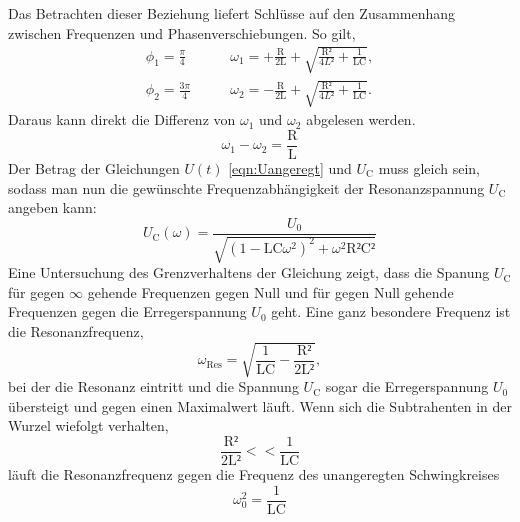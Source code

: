 \documentclass[titlepage = firstcover]{scrartcl}
\begin{document}
            Das Betrachten dieser Beziehung liefert Schlüsse auf den Zusammenhang zwischen Frequenzen und Phasenverschiebungen. So gilt,
            \begin{align}
                \phi_1 = \frac{\pi}{4}  &\qquad \omega_1 = + \frac{\text{R}}{\text{2L}} + \sqrt{\frac{\text{R²}}{4L²} + \frac{1}{\text{LC}}}, \\
                \phi_2 = \frac{3\pi}{4} &\qquad \omega_2 = - \frac{\text{R}}{\text{2L}} + \sqrt{\frac{\text{R²}}{4L²} + \frac{1}{\text{LC}}}.
                \label{eqn:freq}
            \end{align}
            Daraus kann direkt die Differenz von $\omega_1$ und $\omega_2$ abgelesen werden.
            \begin{equation}
                \omega_1 - \omega_2 = \frac{\text{R}}{\text{L}}
                \label{eqn:w1-w2}
            \end{equation}
            Der Betrag der Gleichungen $U(t)$ \ref{eqn:Uangeregt} und $U_{\text{C}}$ muss gleich sein, sodass man nun die gewünschte Frequenzabhängigkeit
            der Resonanzspannung $U_{\text{C}}$ angeben kann:
            \begin{equation}
                U_{\text{C}}(\omega) = \frac{U_0}{\sqrt{\left(1-\text{LC}\omega^2\right)^2 + \omega^2\text{R²C²}}}
                \label{eqn:Uvonw}
            \end{equation}  
            Eine Untersuchung des Grenzverhaltens der Gleichung zeigt, dass die Spanung $U_{\text{C}}$ für gegen $\infty$ gehende Frequenzen gegen Null und für
            gegen Null gehende Frequenzen gegen die Erregerspannung $U_0$ geht. Eine ganz besondere Frequenz ist die Resonanzfrequenz,
            \begin{equation}
                \omega_{\text{Res}} = \sqrt{\frac{1}{\text{LC}}-\frac{\text{R²}}{\text{2L²}}},
                \label{eqn:Resonanzfreq}
            \end{equation}
            bei der die Resonanz eintritt und die Spannung $U_{\text{C}}$ sogar die Erregerspannung $U_0$ übersteigt und gegen einen Maximalwert läuft.
            Wenn sich die Subtrahenten in der Wurzel wiefolgt verhalten,
            \begin{equation*}
                \frac{\text{R²}}{\text{2L²}} << \frac{1}{\text{LC}}
            \end{equation*} 
            läuft die Resonanzfrequenz gegen die Frequenz des unangeregten Schwingkreises
            \begin{equation*}
                \omega_0^2 = \frac{1}{\text{LC}}
            \end{equation*}
\end{document}
